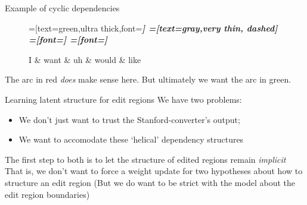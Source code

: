 \documentclass{lecture}
\begin{document}
\begin{plain}{Example of cyclic dependencies}
\begin{figure}
    \centering
    \begin{dependency}[theme=simple]
    =[text=green,ultra thick,font=\bfseries\itshape]
    =[text=gray,very thin, dashed]
    =[font=\bfseries\itshape]
    =[font=\itshape]
    \begin{deptext}[column sep=.075cm, row sep=.1ex]
        I \& want \& uh \& would \& like \\
    \end{deptext}
\end{dependency}
\end{figure}
The arc in red \emph{does} make sense here. But ultimately we want the arc in green.
\end{plain}

\begin{points}{Learning latent structure for edit regions}
\p We have two problems:
\begin{itemize}
    \item We don't just want to trust the Stanford-converter's output;
    \item We want to accomodate these `helical' dependency structures
\end{itemize}
\p The first step to both is to let the structure of edited regions remain \emph{implicit}
\p That is, we don't want to force a weight update for two hypotheses about how
to structure an edit region
\p (But we do want to be strict with the model about the edit region boundaries)   
\end{points}
\end{document}
